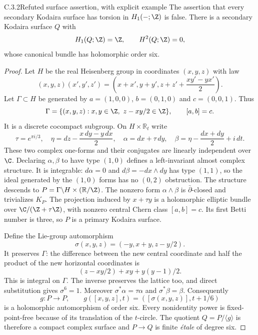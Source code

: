 \begin{idstatement}{C.3.2}{Refuted surface assertion, with explicit example}
\label{st:C.3.2}
The assertion that every secondary Kodaira surface has torsion in
$H_1(-;\Z)$ is false. There is a secondary Kodaira surface $Q$ with
\[
H_1(Q;\Z)=\Z,\qquad H^2(Q;\Z)=0,
\]
whose canonical bundle has holomorphic order six.
\end{idstatement}
\begin{proof}
Let $H$ be the real Heisenberg group in coordinates $(x,y,z)$ with law
\[
(x,y,z)(x',y',z')
=\left(x+x',y+y',z+z'+\frac{xy'-yx'}2\right).
\]
Let $\Gamma\subset H$ be generated by
$a=(1,0,0)$, $b=(0,1,0)$ and $c=(0,0,1)$. Thus
\[
\Gamma=\{(x,y,z):x,y\in\Z,\ z-xy/2\in\Z\},
\qquad [a,b]=c.
\]
It is a discrete cocompact subgroup. On $H\times\mathbb R_t$ write
\[
\tau=e^{\pi i/3},\quad
\eta=dz-\frac{x\,dy-y\,dx}{2},\quad
\alpha=dx+\tau\,dy,\quad
\beta=\eta-\frac{dx+dy}{2}+i\,dt.
\]
These two complex one-forms and their conjugates are linearly
independent over $\C$. Declaring $\alpha,\beta$ to have type $(1,0)$
defines a left-invariant almost complex structure. It is integrable:
$d\alpha=0$ and $d\beta=-dx\wedge dy$ has type $(1,1)$, so the
ideal generated by the $(1,0)$ forms has no $(0,2)$ obstruction.
The structure descends to
$P=\Gamma\backslash H\times(\mathbb R/\Z)$.
The nonzero form $\alpha\wedge\beta$ is $\bar\partial$-closed and
trivializes $K_P$. The projection induced by $x+\tau y$ is a
holomorphic elliptic bundle over $\C/(\Z+\tau\Z)$, with nonzero
central Chern class $[a,b]=c$. Its first Betti number is three, so
$P$ is a primary Kodaira surface.

Define the Lie-group automorphism
\[
\sigma(x,y,z)=(-y,x+y,z-y/2).
\]
It preserves $\Gamma$: the difference between the new central
coordinate and half the product of the new horizontal coordinates
is
\[
(z-xy/2)+xy+y(y-1)/2.
\]
This is integral on $\Gamma$. The inverse preserves the lattice too,
and direct substitution gives $\sigma^6=1$. Moreover
$\sigma^*\alpha=\tau\alpha$ and $\sigma^*\beta=\beta$.
Consequently
\[
g:P\longrightarrow P,\qquad
g([x,y,z],t)=([\sigma(x,y,z)],t+1/6)
\]
is a holomorphic automorphism of order six. Every nonidentity power
is fixed-point-free because of its translation of the $t$-circle.
The quotient $Q=P/\langle g\rangle$ is therefore a compact complex
surface and $P\to Q$ is finite \emph{\'etale} of degree six.


\end{proof}
